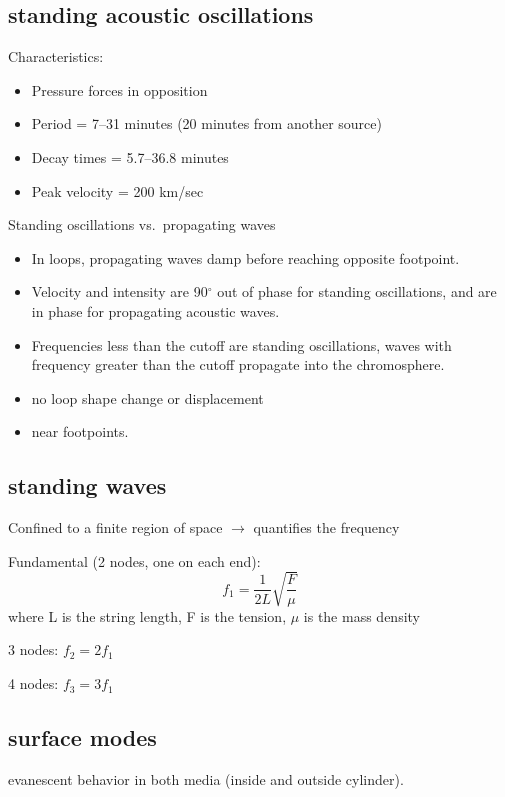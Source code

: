 \documentclass[12pt]{article}
\begin{document}
\subsection*{standing acoustic oscillations}
Characteristics:
\begin{itemize}
    \item Pressure forces in opposition
    \item Period = 7--31 minutes (20 minutes from another source)
    \item Decay times = 5.7--36.8 minutes
    \item Peak velocity = 200 km/sec
\end{itemize}
Standing oscillations vs.\ propagating waves
\begin{itemize}
    \item In loops, propagating waves damp before
        reaching opposite footpoint.
    \item Velocity and intensity are 90$^{\circ}$ out of phase
        for standing oscillations, and are in phase for propagating
        acoustic waves.
    \item Frequencies less than the cutoff are standing oscillations,
        waves with frequency greater than the cutoff propagate into
        the chromosphere.
    \item no loop shape change or displacement
    \item near footpoints.
\end{itemize}


\subsection*{standing waves}
Confined to a finite region of space $\rightarrow$ quantifies the frequency
\begin{itemize*}
    \item Fundamental (2 nodes, one on each end):
        $$f_1 = \frac{1}{2L}\sqrt{\frac{F}{\mu}}$$
        where L is the string length, F is the tension, $\mu$ is the mass density
    \item 3 nodes: $f_2 = 2f_1$
    \item 4 nodes: $f_3 = 3f_1$
\end{itemize*}


\subsection*{surface modes}
evanescent behavior in both media (inside and outside cylinder).
\end{document}
